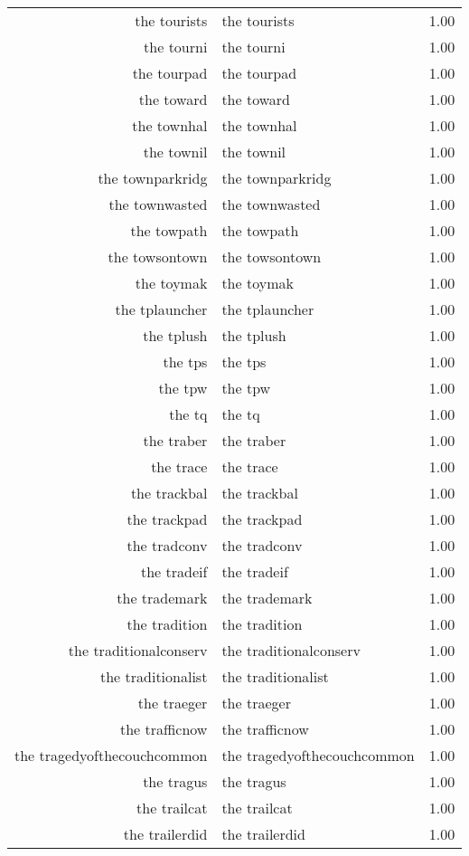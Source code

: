 \begin{table}[ht]
\begin{tabular}{rlr}
  the tourists & the tourists & 1.00 \\ 
  the tourni & the tourni & 1.00 \\ 
  the tourpad & the tourpad & 1.00 \\ 
  the toward & the toward & 1.00 \\ 
  the townhal & the townhal & 1.00 \\ 
  the townil & the townil & 1.00 \\ 
  the townparkridg & the townparkridg & 1.00 \\ 
  the townwasted & the townwasted & 1.00 \\ 
  the towpath & the towpath & 1.00 \\ 
  the towsontown & the towsontown & 1.00 \\ 
  the toymak & the toymak & 1.00 \\ 
  the tplauncher & the tplauncher & 1.00 \\ 
  the tplush & the tplush & 1.00 \\ 
  the tps & the tps & 1.00 \\ 
  the tpw & the tpw & 1.00 \\ 
  the tq & the tq & 1.00 \\ 
  the traber & the traber & 1.00 \\ 
  the trace & the trace & 1.00 \\ 
  the trackbal & the trackbal & 1.00 \\ 
  the trackpad & the trackpad & 1.00 \\ 
  the tradconv & the tradconv & 1.00 \\ 
  the tradeif & the tradeif & 1.00 \\ 
  the trademark & the trademark & 1.00 \\ 
  the tradition & the tradition & 1.00 \\ 
  the traditionalconserv & the traditionalconserv & 1.00 \\ 
  the traditionalist & the traditionalist & 1.00 \\ 
  the traeger & the traeger & 1.00 \\ 
  the trafficnow & the trafficnow & 1.00 \\ 
  the tragedyofthecouchcommon & the tragedyofthecouchcommon & 1.00 \\ 
  the tragus & the tragus & 1.00 \\ 
  the trailcat & the trailcat & 1.00 \\ 
  the trailerdid & the trailerdid & 1.00 \\ 

\end{tabular}
\end{table}
